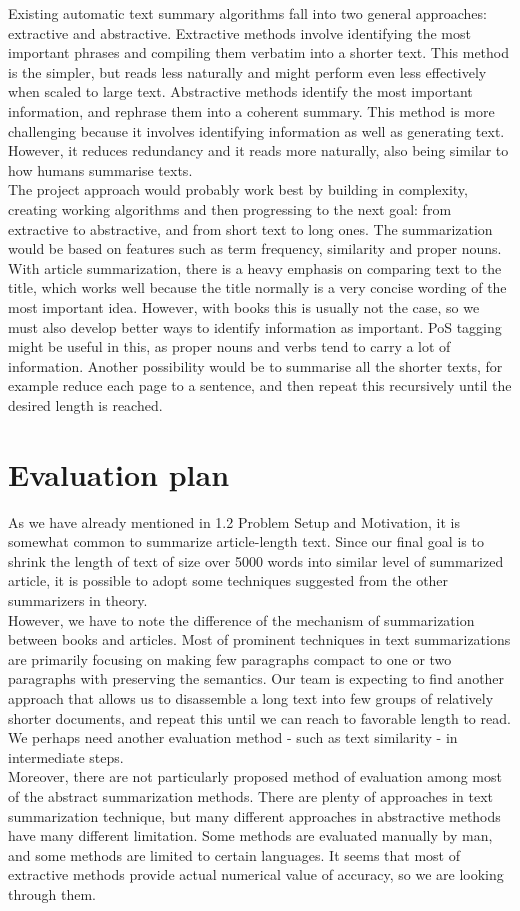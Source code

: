 Existing automatic text summary algorithms fall into two general approaches: extractive and abstractive. Extractive methods involve identifying the most important phrases and compiling them verbatim into a shorter text. This method is the simpler, but reads less naturally and might perform even less effectively when scaled to large text. Abstractive methods identify the most important information, and rephrase them into a coherent summary. This method is more challenging because it involves identifying information as well as generating text. However, it reduces redundancy and it reads more naturally, also being similar to how humans summarise texts. \cite{Gaikwad2016} \\
The project approach would probably work best by building in complexity, creating working algorithms and then progressing to the next goal: from extractive to abstractive, and from short text to long ones. The summarization would be based on features such as term frequency, similarity and proper nouns. With article summarization, there is a heavy emphasis on comparing text to the title, which works well because the title normally is a very concise wording of the most important idea. However, with books this is usually not the case, so we must also develop better ways to identify information as important. PoS tagging might be useful in this, as proper nouns and verbs tend to carry a lot of information. Another possibility would be to summarise all the shorter texts, for example reduce each page to a sentence, and then repeat this recursively until the desired length is reached.

\section{Evaluation plan}

As we have already mentioned in 1.2 Problem Setup and Motivation, it is somewhat common to summarize article-length text. Since our final goal is to shrink the length of text of size over 5000 words into similar level of summarized article, it is possible to adopt some techniques suggested from the other summarizers in theory. \\
However, we have to note the difference of the mechanism of summarization between books and articles. Most of prominent techniques in text summarizations are primarily focusing on making few paragraphs compact to one or two paragraphs with preserving the semantics. Our team is expecting to find another approach that allows us to disassemble a long text into few groups of relatively shorter documents, and repeat this until we can reach to favorable length to read. We perhaps need another evaluation method - such as text similarity \cite{Do2010RobustLA} - in intermediate steps. \\
Moreover, there are not particularly proposed method of evaluation among most of the abstract summarization methods. There are plenty of approaches in text summarization technique, but many different approaches in abstractive methods have many different limitation. Some methods are evaluated manually by man, and some methods are limited to certain languages. It seems that most of extractive methods provide actual numerical value of accuracy, so we are looking through them.

